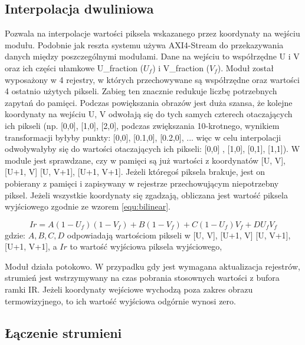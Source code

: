 \subsection{Interpolacja dwuliniowa} %
Pozwala na interpolacje wartości piksela wskazanego przez koordynaty na wejściu modułu.
Podobnie jak reszta systemu używa AXI4-Stream do przekazywania danych między poszczególnymi modułami.
Dane na wejściu to współrzędne U i V oraz ich części ułamkowe U\_fraction ($U_f$) i V\_fraction ($V_f$).
Moduł został wyposażony w 4 rejestry, w których przechowywane są współrzędne oraz wartości 4 ostatnio użytych pikseli.
Zabieg ten znacznie redukuje liczbę potrzebnych zapytań do pamięci.
Podczas powiększania obrazów jest duża szansa, że kolejne koordynaty na wejściu U, V odwołają się do tych samych czterech otaczających ich pikseli (np. [0,0], [1,0], [2,0], podczas zwiększania 10-krotnego, wynikiem transformacji byłyby punkty: [0,0], [0.1,0], [0.2,0], ... więc w celu interpolacji odwoływałyby się do wartości otaczających ich pikseli: [0,0] , [1,0], [0,1], [1,1]).
W module jest sprawdzane, czy w pamięci są już wartości z koordynatów [U, V], [U+1, V] [U, V+1], [U+1, V+1].
Jeżeli któregoś piksela brakuje, jest on pobierany z pamięci i zapisywany w rejestrze przechowującym niepotrzebny piksel.
Jeżeli wszystkie koordynaty się zgadzają, obliczana jest wartość piksela wyjściowego zgodnie ze wzorem \eqref{equ:bilinear}.

\begin{equation}\label{equ:bilinear}
Ir = A(1-U_{f})(1-V_{f})+B(1-V_{f})+C(1- U_{f})V_{f}+ D U_{f} V_{f}
\end{equation}
\noindent gdzie: $ A, B, C,D $ odpowiadają wartościom pikseli w [U, V], [U+1, V] [U, V+1], [U+1, V+1], a $ Ir $ to wartość wyjściowa piksela wyjściowego, %

Moduł działa potokowo. W przypadku gdy jest wymagana aktualizacja rejestrów, strumień jest wstrzymywany na czas pobrania stosownych wartości z bufora ramki IR. Jeżeli koordynaty wejściowe wychodzą poza zakres obrazu termowizyjnego, to ich wartość wyjściowa odgórnie wynosi zero.

\subsection{Łączenie strumieni}

